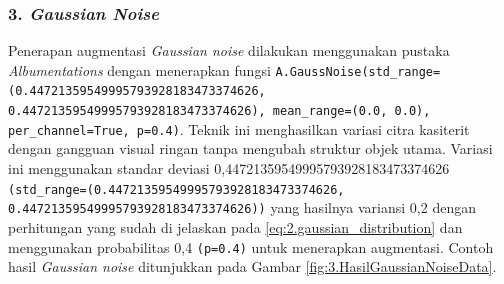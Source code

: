 

\subsubsection*{\textnormal{3. \textit{Gaussian Noise}}}
Penerapan augmentasi \textit{Gaussian noise} dilakukan menggunakan pustaka \textit{Albumentations} dengan menerapkan fungsi \texttt{A.GaussNoise(std\_range=(0.44721359549995793928183473374626, 0.44721359549995793928183473374626), mean\_range=(0.0, 0.0), per\_channel=True, p=0.4)}. Teknik ini menghasilkan variasi citra kasiterit dengan gangguan visual ringan tanpa mengubah struktur objek utama. Variasi ini menggunakan standar deviasi 0{,}44721359549995793928183473374626 \texttt{(std\_range=(0.44721359549995793928183473374626, 0.44721359549995793928183473374626))} yang hasilnya variansi 0{,}2 dengan perhitungan yang sudah di jelaskan pada \ref{eq:2.gaussian_distribution} dan menggunakan probabilitas 0{,}4 \texttt{(p=0.4)} untuk menerapkan augmentasi. Contoh hasil \textit{Gaussian noise} ditunjukkan pada Gambar \ref{fig:3.HasilGaussianNoiseData}. \par


